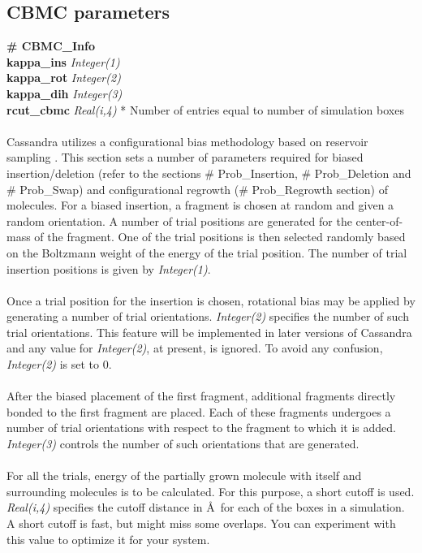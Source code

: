 {{{\subsection{CBMC parameters}\label{sec:CBMC_Info}
{\bf \# CBMC\_Info} \\
{\bf kappa\_ins} {\it Integer(1)} \\
{\bf kappa\_rot} {\it Integer(2)} \\
{\bf kappa\_dih} {\it Integer(3)} \\
{\bf rcut\_cbmc} {\it Real(i,4)} * Number of entries equal to number of simulation boxes\\ \\
%
Cassandra utilizes a configurational bias methodology based on reservoir sampling \cite{Shah:2011}.
This section sets a number of parameters required for biased insertion/deletion (refer to the sections
\# Prob\_Insertion, \# Prob\_Deletion and \# Prob\_Swap) and configurational
regrowth (\# Prob\_Regrowth section) of molecules. For a biased insertion, a fragment is chosen at random and given
a random orientation. A number of trial positions are generated for the center-of-mass of the fragment.
One of the trial positions is then selected randomly based on the Boltzmann weight of the energy of
the trial position. The number of trial insertion positions is given by {\it Integer(1)}. \\ \\
%
Once a trial position for the insertion is chosen, rotational bias may be applied by generating a number
of trial orientations. {\it Integer(2)} specifies the number of such trial orientations. This feature will be
implemented in later versions of Cassandra and any value for {\it Integer(2)}, at present, is ignored.
To avoid any confusion, {\it Integer(2)} is set to 0. \\ \\
%
After the biased placement of the first fragment, additional fragments directly bonded to the first fragment
are placed. Each of these fragments undergoes a number of trial orientations with  respect
to the fragment to which it is added. {\it Integer(3)} controls the number of such orientations that are
generated. \\ \\
%
For all the trials, energy of the partially grown molecule with itself and surrounding molecules is to be calculated. For this purpose, a short
cutoff is used. {\it Real(i,4)} specifies the cutoff distance in \AA\ for each of the boxes in a simulation. A short cutoff is fast, but might miss some overlaps. You can experiment with this value to optimize it for your system.\\ \\
}}}
